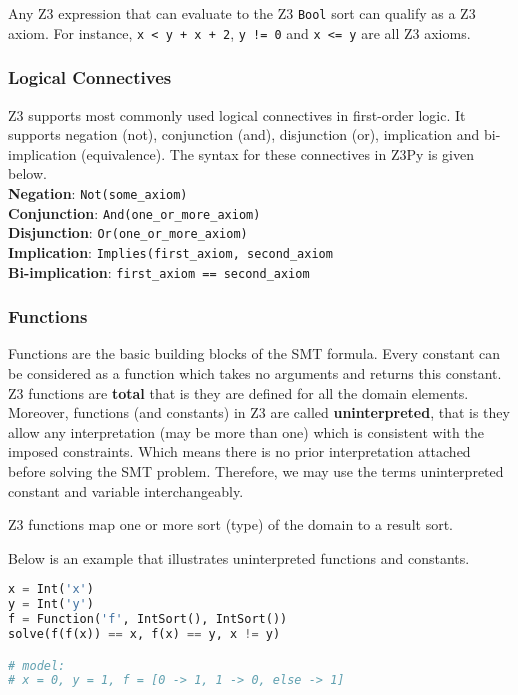 Any Z3 expression that can evaluate to the Z3 \lstinline|Bool| sort can qualify as a Z3 axiom. For instance, \lstinline|x < y + x + 2|, \lstinline|y != 0| and \lstinline|x <= y| are all Z3 axioms.


\subsubsection{Logical Connectives}
Z3 supports most commonly used logical connectives in first-order logic. It supports negation (not), conjunction (and), disjunction (or), implication and bi-implication (equivalence). The syntax for these connectives in Z3Py is given below.\\
\textbf{Negation}: \lstinline|Not(some_axiom)|\\
\textbf{Conjunction}: \lstinline|And(one_or_more_axiom)|\\
\textbf{Disjunction}: \lstinline|Or(one_or_more_axiom)|\\
\textbf{Implication}: \lstinline|Implies(first_axiom, second_axiom|\\
\textbf{Bi-implication}: \lstinline|first_axiom == second_axiom|\\


\subsubsection{Functions}
Functions are the basic building blocks of the SMT formula. Every constant can be considered as a function which takes no arguments and returns this constant.
Z3 functions are \textbf{total} that is they are defined for all the domain elements. Moreover, functions (and constants) in Z3 are called \textbf{uninterpreted}, that is they allow any interpretation (may be more than one) which is consistent with the imposed constraints. Which means there is no prior interpretation attached before solving the SMT problem. Therefore, we may use the terms uninterpreted constant and variable interchangeably.

Z3 functions map one or more sort (type) of the domain to a result sort.

Below is an example that illustrates uninterpreted functions and constants.

\begin{lstlisting}[language=python]
x = Int('x')
y = Int('y')
f = Function('f', IntSort(), IntSort())
solve(f(f(x)) == x, f(x) == y, x != y)

# model:
# x = 0, y = 1, f = [0 -> 1, 1 -> 0, else -> 1]
\end{lstlisting}
